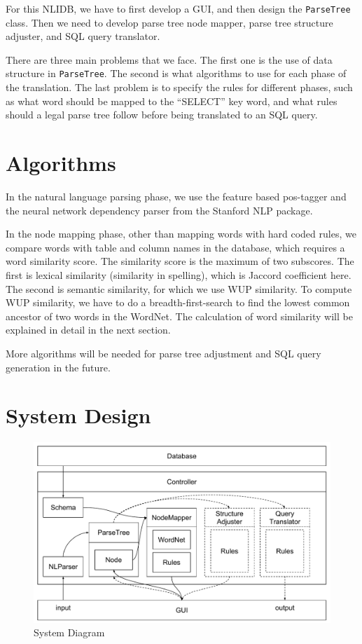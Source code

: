 \documentclass[twocolumn]{article}
\begin{document}
For this NLIDB, we have to first develop a GUI, and then design the \texttt{ParseTree} class. Then we need to develop parse tree node mapper, parse tree structure adjuster, and SQL query translator.

There are three main problems that we face. The first one is the use of data structure in \texttt{ParseTree}. The second is what algorithms to use for each phase of the translation. The last problem is to specify the rules for different phases, such as what word should be mapped to the ``SELECT'' key word, and what rules should a legal parse tree follow before being translated to an SQL query.

\section{Algorithms}

In the natural language parsing phase, we use the feature based pos-tagger\cite{toutanova2003feature} and the neural network dependency parser\cite{chen2014fast} from the Stanford NLP package.

In the node mapping phase, other than mapping words with hard coded rules, we compare words with table and column names in the database, which requires a word similarity score. The similarity score is the maximum of two subscores. The first is lexical similarity (similarity in spelling), which is Jaccord coefficient here. The second is semantic similarity, for which we use WUP similarity\cite{wu1994verbs}. To compute WUP similarity, we have to do a breadth-first-search to find the lowest common ancestor of two words in the WordNet. The calculation of word similarity will be explained in detail in the next section.

More algorithms will be needed for parse tree adjustment and SQL query generation in the future.

\section{System Design}

\begin{figure}[ht]
  \centering
  \includegraphics[width=0.8\linewidth]{figures/nlidb_system_diagram.pdf}
  \caption{System Diagram}
\end{figure}
\end{document}
